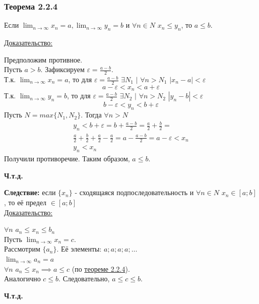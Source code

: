 \documentclass[12pt]{article}
\def\posl#1#2{\{#1_{#2}\}}
\begin{document}
    \subsubsection*{Теорема 2.2.4}\label{th:2.2.4}
    Если $\lim_{n\to\infty}x_n = a, \lim_{n\to\infty}y_n = b$ и $\forall n \in N$ $x_n \le y_n$, то $a \le b$.\par\noindent
    \underline{Доказательство:} 
    \begin{adjustwidth}{1.5em}{1.5em}
        Предположим противное.\\
        Пусть $a > b$. Зафиксируем $\varepsilon = \frac{a-b}{2}$.\\
        Т.к. $\lim_{n\to\infty} x_n = a$, то для $\varepsilon = \frac{a-b}{2}$ $\exists N_{1}$ $\big|$ $\forall n > N_{1}$ $|x_n - a| < \varepsilon$
        \[
            a - \varepsilon < x_n < a + \varepsilon
        \]
        Т.к. $\lim_{n\to\infty} y_n = b$, то для $\varepsilon = \frac{a-b}{2}$ $\exists N_{2}$ $\big|$ $\forall n > N_{2}$ $|y_n - b| < \varepsilon$
        \[
            b - \varepsilon < y_n < b + \varepsilon
        \]
        Пусть $N = max\{N_{1}, N_{2}\}$. Тогда $\forall n > N$
        \begin{gather*}
            y_n < b + \varepsilon = b + \frac{a-b}{2} = \frac{a}{2} + \frac{b}{2} =\\
            \frac{a}{2} + \frac{b}{2} + \frac{a}{2} - \frac{a}{2} = a - \frac{a-b}{2} = a - \varepsilon < x_n\\
            y_n < x_n
        \end{gather*}
        Получили противоречие. Таким образом, $a \le b$.
        \begin{center}
            \textbf{Ч.т.д.}
        \end{center}        
    \end{adjustwidth}
    
    \noindent \textbf{Следствие:} если $\posl{x}{n}$ - сходящаяся подпоследовательность и $\forall n \in N$ $x_n \in [a;b]$, то её предел $\in [a;b]$\\
    \underline{Доказательство:} 
    \begin{adjustwidth}{1.5em}{1.5em}
        $\forall n$ $a_{n} \le x_n \le b_{n}$\\
        Пусть $\lim_{n\to\infty}x_n = c$.\\
        Рассмотрим $\posl{a}{n}$. Её элементы: $a; a; a; a; \dots$\\
        $\lim_{n\to\infty}a_{n} = a$\\
        $\forall n$ $a_{n} \le x_n \implies a \le c$ (по \hyperref[th:2.2.4]{теореме 2.2.4}).\\
        Аналогично $c \le b$. Следовательно, $a \le c \le b$.
        \begin{center}
            \textbf{Ч.т.д.}
        \end{center}
    \end{adjustwidth}
\end{document}
